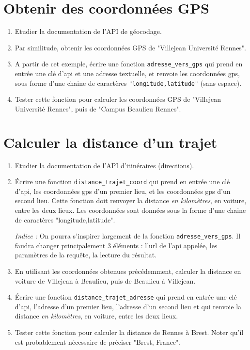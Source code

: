 \documentclass[11pt,a4paper]{article}
\begin{document}
\section{Obtenir des coordonnées GPS}
\begin{enumerate}
    \item Etudier la documentation de l'API de géocodage.
    \item Par similitude, obtenir les coordonnées GPS de "Villejean Université Rennes".
    \item A partir de cet exemple, écrire une fonction \verb+adresse_vers_gps+ qui prend en entrée une clé d'api et une adresse textuelle, et renvoie les coordonnées gps, sous forme d'une chaine de caractères \verb+"longitude,latitude"+ (sans espace).
    \item Tester cette fonction pour calculer les coordonnées GPS de "Villejean Université Rennes", puis de "Campus Beaulieu Rennes".
\end{enumerate}


\section{Calculer la distance d'un trajet}

\begin{enumerate}
    \item Etudier la documentation de l'API d'itinéraires (directions). 
    \item Écrire une fonction \verb+distance_trajet_coord+ qui prend en entrée une clé d'api, les coordonnées gps d'un premier lieu, et les coordonnées gps d'un second lieu. Cette fonction doit renvoyer la distance \emph{en kilomètres}, en voiture, entre les deux lieux. Les coordonnées sont données sous la forme d'une chaine de caractères "longitude,latitude".
    
    \emph{Indice :} On pourra s'inspirer largement de la fonction \verb+adresse_vers_gps+. Il faudra changer principalement 3 éléments : l'url de l'api appelée, les paramètres de la requête, la lecture du résultat.
    
    \item En utilisant les coordonnées obtenues précédemment, calculer la distance en voiture de Villejean à Beaulieu, puis de Beaulieu à Villejean.

    \item Écrire une fonction \verb+distance_trajet_adresse+ qui prend en entrée une clé d'api, l'adresse d'un premier lieu, l'adresse d'un second lieu et qui renvoie la distance  \emph{en kilomètres}, en voiture, entre les deux lieux. 
    \item Tester cette fonction pour calculer la distance de Rennes à Brest. Noter qu'il est probablement nécessaire de préciser "Brest, France".
\end{enumerate}
\end{document}
